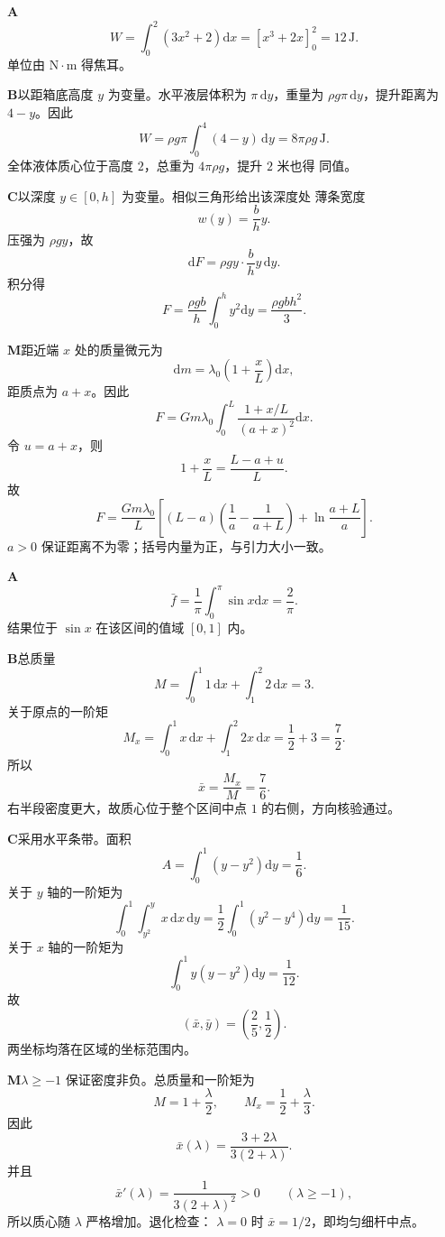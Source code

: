 \begin{solutionBox}
\textbf{A}\quad
\[
W=\int_0^2(3x^2+2)\mathrm dx
=[x^3+2x]_0^2=12\,\mathrm J.
\]
单位由 \(\mathrm N\cdot\mathrm m\) 得焦耳。
\end{solutionBox}
\begin{solutionBox}
\textbf{B}\quad 以距箱底高度 \(y\) 为变量。水平液层体积为
\(\pi\,\mathrm dy\)，重量为 \(\rho g\pi\,\mathrm dy\)，提升距离为
\(4-y\)。因此
\[
W=\rho g\pi\int_0^4(4-y)\,\mathrm dy
=8\pi\rho g\,\mathrm J.
\]
全体液体质心位于高度 \(2\)，总重为 \(4\pi\rho g\)，提升 \(2\) 米也得
同值。
\end{solutionBox}
\begin{solutionBox}
\textbf{C}\quad 以深度 \(y\in[0,h]\) 为变量。相似三角形给出该深度处
薄条宽度
\[
w(y)=\frac bhy.
\]
压强为 \(\rho gy\)，故
\[
\mathrm dF=\rho gy\cdot\frac bhy\,\mathrm dy.
\]
积分得
\[
\boxed{
F=\frac{\rho gb}{h}\int_0^hy^2\mathrm dy
=\frac{\rho gbh^2}{3}
}.
\]
\end{solutionBox}
\begin{solutionBox}
\textbf{M}\quad 距近端 \(x\) 处的质量微元为
\[
\mathrm dm=\lambda_0\left(1+\frac xL\right)\mathrm dx,
\]
距质点为 \(a+x\)。因此
\[
F=Gm\lambda_0\int_0^L
\frac{1+x/L}{(a+x)^2}\mathrm dx.
\]
令 \(u=a+x\)，则
\[
1+\frac xL=\frac{L-a+u}{L}.
\]
故
\[
\boxed{
F=\frac{Gm\lambda_0}{L}
\left[
(L-a)\left(\frac1a-\frac1{a+L}\right)
+\ln\frac{a+L}{a}
\right]}.
\]
\(a>0\) 保证距离不为零；括号内量为正，与引力大小一致。
\end{solutionBox}

\begin{solutionBox}
\textbf{A}\quad
\[
\bar f=\frac1\pi\int_0^\pi\sin x\mathrm dx
=\frac2\pi.
\]
结果位于 \(\sin x\) 在该区间的值域 \([0,1]\) 内。
\end{solutionBox}
\begin{solutionBox}
\textbf{B}\quad 总质量
\[
M=\int_0^1 1\,\mathrm dx+\int_1^2 2\,\mathrm dx=3.
\]
关于原点的一阶矩
\[
M_x=\int_0^1x\,\mathrm dx+\int_1^2 2x\,\mathrm dx
=\frac12+3=\frac72.
\]
所以
\[
\boxed{\bar x=\frac{M_x}{M}=\frac76}.
\]
右半段密度更大，故质心位于整个区间中点 \(1\) 的右侧，方向核验通过。
\end{solutionBox}
\begin{solutionBox}
\textbf{C}\quad 采用水平条带。面积
\[
A=\int_0^1(y-y^2)\mathrm dy=\frac16.
\]
关于 \(y\) 轴的一阶矩为
\[
\int_0^1\int_{y^2}^{y}x\,\mathrm dx\,\mathrm dy
=\frac12\int_0^1(y^2-y^4)\mathrm dy=\frac1{15}.
\]
关于 \(x\) 轴的一阶矩为
\[
\int_0^1y(y-y^2)\mathrm dy=\frac1{12}.
\]
故
\[
\boxed{(\bar x,\bar y)=\left(\frac25,\frac12\right)}.
\]
两坐标均落在区域的坐标范围内。
\end{solutionBox}
\begin{solutionBox}
\textbf{M}\quad \(\lambda\ge-1\) 保证密度非负。总质量和一阶矩为
\[
M=1+\frac\lambda2,\qquad
M_x=\frac12+\frac\lambda3.
\]
因此
\[
\boxed{
\bar x(\lambda)
=\frac{3+2\lambda}{3(2+\lambda)}
}.
\]
并且
\[
\bar x'(\lambda)
=\frac1{3(2+\lambda)^2}>0
\qquad(\lambda\ge-1),
\]
所以质心随 \(\lambda\) 严格增加。退化检查：
\(\lambda=0\) 时 \(\bar x=1/2\)，即均匀细杆中点。
\end{solutionBox}
